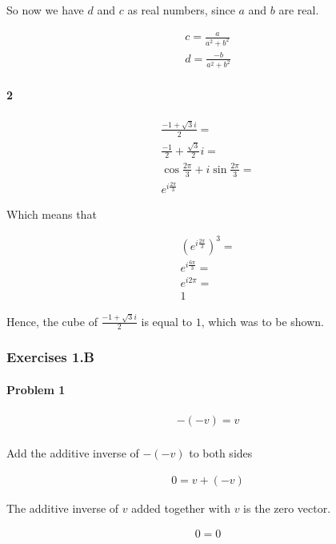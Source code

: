 So now we have $d$ and $c$ as real numbers, since $a$ and $b$ are real.

\begin{align*}
	c = \frac{a}{a^2+b^2} \\
	d = \frac{-b}{a^2+b^2}
\end{align*}
\dotfill

\paragraph{2}

\begin{align*}
	\frac{-1+\sqrt{3}i}{2} = \\
	\frac{-1}{2} + \frac{\sqrt{3}}{2}i = \\
	\cos \frac{2\pi}{3} + i\sin \frac{2\pi}{3} = \\
	e^{i\frac{2\pi}{3}}
\end{align*}

Which means that 

\begin{align*}
	\left( e^{i\frac{2\pi}{3}} \right)^3 = \\
	e^{i\frac{6\pi}{3}} = \\
	e^{i2\pi} = \\
	1
\end{align*}

Hence, the cube of $\frac{-1+\sqrt{3}i}{2}$ is equal to $1$, which was to be shown.

\subsubsection{Exercises 1.B}

\paragraph{Problem 1}

\begin{align*}
	-(-v) = v \\
\end{align*}

Add the additive inverse of $-(-v)$ to both sides

\begin{align*}
	0 = v+(-v)
\end{align*}

The additive inverse of $v$ added together with $v$ is the zero vector.

\begin{align*}
	0 = 0
\end{align*}

